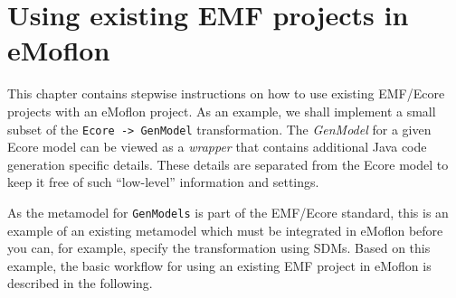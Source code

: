 \newpage

\section{Using existing EMF projects in eMoflon}
\visHeader

This chapter contains stepwise instructions on how to use existing \mbox{EMF}/\-Ecore projects with an eMoflon project.  As an example, we shall implement a
small subset of the \texttt{Ecore -> GenModel} transformation. The \emph{GenModel} for a given Ecore model can be viewed as a \emph{wrapper} that contains
additional Java code generation specific details. These details are separated from the Ecore model to keep it free of such ``low-level'' information and
settings.

As the metamodel for \texttt{GenModels} is part of the EMF/Ecore standard, this is an example of an existing metamodel which must be integrated in eMoflon
before you can, for example, specify the transformation using SDMs.
Based on this example, the basic workflow for using an existing EMF project in eMoflon is described in the following.




